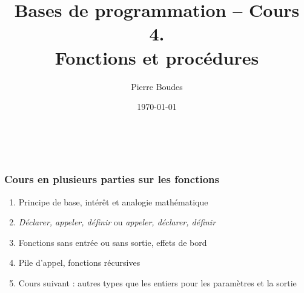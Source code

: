 \documentclass[xcolor=pdftex,svgnames,table]{beamer}
\title{Bases de programmation -- Cours 4.\\ Fonctions et procédures}
\author{Pierre Boudes}
\date{\today}
\begin{document}
\begin{frame}
	\titlepage
	\vfill
	\begin{center}
		\\[2.5ex]
		{\tiny\CcNote{\CcLongnameByNcSa}}
		\vspace*{-2.5ex}
	\end{center}
\end{frame}



\begin{frame}
  \frametitle{Cours en plusieurs parties sur les fonctions \nowrite}

\begin{enumerate}
    \item Principe de base, intérêt et analogie mathématique
      \item \emph{Déclarer, appeler, définir} ou \emph{appeler, déclarer, définir}
    \item Fonctions sans entrée ou sans sortie, effets de bord
    \item Pile d'appel, fonctions récursives
    \item Cours suivant : autres types que les entiers pour les paramètres et la sortie
  \end{enumerate}
\end{frame}

\section[Plan]{}
\end{document}
